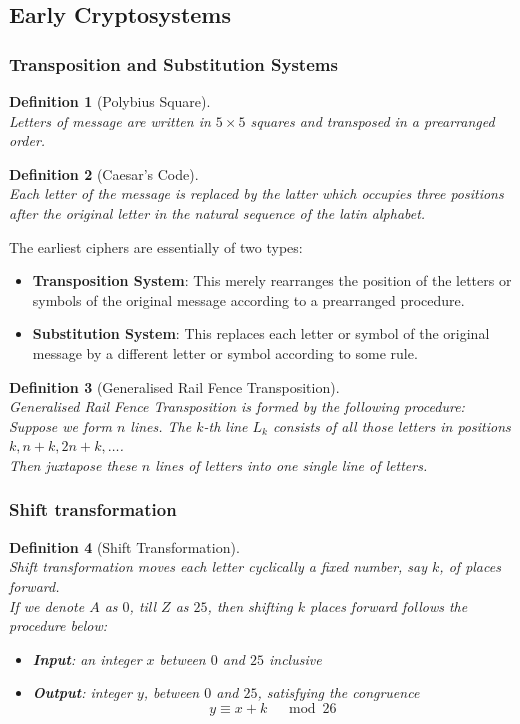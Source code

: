 \documentclass[12pt]{article}
\newtheorem{definition}{Definition}[section]
\theoremstyle{definition}
\begin{document}
\subsection{Early Cryptosystems}
\subsubsection{Transposition and Substitution Systems}
\begin{definition}[Polybius Square]
\hfill\\\normalfont Letters of message are written in $5\times 5$ squares and transposed in a prearranged order.
\end{definition}
\begin{definition}[Caesar's Code]
\hfill\\\normalfont Each letter of the message is replaced by the latter which occupies three positions after the original letter in the natural sequence of the latin alphabet.
\end{definition}
The earliest ciphers are essentially of two types:
\begin{itemize}
  \item \textbf{Transposition System}: This merely rearranges the position of the letters or symbols of the original message according to a prearranged procedure.
  \item \textbf{Substitution System}: This replaces each letter or symbol of the original message by a different letter or symbol according to some rule.
\end{itemize}
\begin{definition}[Generalised Rail Fence Transposition]
\hfill\\\normalfont Generalised Rail Fence Transposition is formed by the following procedure:\\Suppose we form $n$ lines. The $k$-th line $L_k$ consists of all those letters in positions $k, n+k, 2n+k,\ldots$. \\Then juxtapose these $n$ lines of letters into one single line of letters.
\end{definition}
\subsubsection{Shift transformation}
\begin{definition}[Shift Transformation]
\hfill\\\normalfont Shift transformation moves each letter cyclically a fixed number, say $k$, of places forward.\\If we denote $A$ as $0$, till $Z$ as $25$, then shifting $k$ places forward follows the procedure below:
\begin{itemize}
  \item \textbf{Input}: an integer $x$ between $0$ and $25$ inclusive
  \item \textbf{Output}: integer $y$, between $0$ and $25$, satisfying the congruence
  \[
y\equiv x+k \;\;\;\mod 26
  \]
\end{itemize}
\end{definition}
\end{document}
